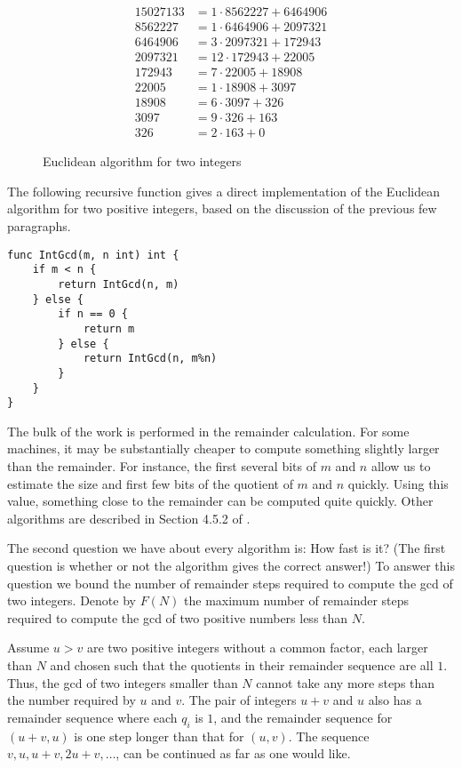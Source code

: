 \begin{figure}
\[
\begin{aligned}
  15027133 &= 1 \cdot 8562227 + 6464906\\
  8562227  &= 1 \cdot 6464906 + 2097321\\
  6464906  &= 3 \cdot 2097321 + 172943\\
  2097321  &= 12 \cdot 172943  + 22005\\
  172943   &= 7 \cdot 22005   + 18908\\
  22005    &= 1 \cdot 18908   + 3097\\
  18908    &= 6 \cdot 3097    + 326\\
  3097     &= 9 \cdot 326     + 163\\
  326      &= 2 \cdot 163     + 0
\end{aligned}
\]
\caption{Euclidean algorithm for two integers\label{Int:Euclid:Alg:Fig}}
\end{figure}


The following recursive function gives a direct implementation of the
Euclidean algorithm for two positive integers, based on the discussion
of the previous few paragraphs.

\begin{verbatim}
func IntGcd(m, n int) int {
	if m < n {
		return IntGcd(n, m)
	} else {
		if n == 0 {
			return m
		} else {
			return IntGcd(n, m%n)
		}
	}
}
\end{verbatim}

The bulk of the work is performed in the remainder calculation.  For
some machines, it may be substantially cheaper to compute something
slightly larger than the remainder.  For instance, the first several
bits of $m$ and $n$ allow us to estimate the size and first few bits
of the quotient of $m$ and $n$ quickly.  Using this value, something
close to the remainder can be computed quite quickly.  Other
algorithms are described in Section 4.5.2 of {\Knuth} \cite{Knuth:II}.

The second question we have about every algorithm is: How fast is it?
(The first question is whether or not the algorithm gives the correct
answer!)  To answer this question we bound the number of remainder
steps required 
to compute the {\sc gcd} of two integers.  Denote by $F(N)$ the
maximum number of 
remainder steps required to compute the {\sc gcd} of two positive
numbers less than $N$.

Assume $u > v$ are two positive integers without a common factor, each
larger than $N$ and chosen such that the quotients in their remainder
sequence are all $1$.  Thus, the {\sc gcd} of two integers smaller
than $N$ cannot take any more steps than the number required by $u$
and $v$.  The pair of integers $u+v$ and $u$ also has a remainder
sequence where each $q_i$ is $1$, and the remainder sequence for
$(u+v, u)$ is one step longer than that for $(u, v)$.  The sequence
$v, u, u+v, 2u+v,
\ldots$, can be continued as far as one would like.

